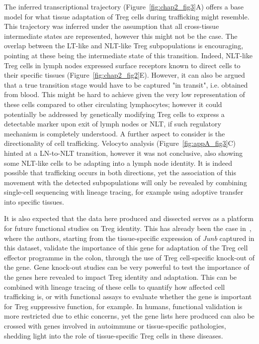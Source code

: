 The inferred transcriptional trajectory (Figure~\ref{fig:chap2_fig3}A) offers a base model for what tissue adaptation of Treg cells during trafficking might resemble. This trajectory was inferred under the assumption that all cross-tissue intermediate states are represented, however this might not be the case. The overlap between the LT-like and NLT-like Treg subpopulations is encouraging, pointing at these being the intermediate state of this transition. Indeed, NLT-like Treg cells in lymph nodes expressed surface receptors known to direct cells to their specific tissues (Figure~\ref{fig:chap2_fig2}E). However, it can also be argued that a true transition stage would have to be captured "in transit", i.e. obtained from blood. This might be hard to achieve given the very low representation of these cells compared to other circulating lymphocytes; however it could potentially be addressed by genetically modifying Treg cells to express a detectable marker upon exit of lymph nodes or NLT, if such regulatory mechanism is completely understood. A further aspect to consider is the directionality of cell trafficking. Velocyto analysis (Figure~\ref{fig:appA_fig3}C) hinted at a LN-to-NLT transition, however it was not conclusive, also showing some NLT-like cells to be adapting into a lymph node identity. It is indeed possible that trafficking occurs in both directions, yet the association of this movement with the detected subpopulations will only be revealed by combining single-cell sequencing with lineage tracing, for example using adoptive transfer into specific tissues.

It is also expected that the data here produced and dissected serves as a platform for future functional studies on Treg identity. This has already been the case in~\citep{wheaton_junb_2019}, where the authors, starting from the tissue-specific expression of \textit{Junb} captured in this dataset, validate the importance of this gene for adaptation of the Treg cell effector programme in the colon, through the use of Treg cell-specific knock-out of the gene. Gene knock-out studies can be very powerful to test the importance of the genes here revealed to impact Treg identity and adaptation. This can be combined with lineage tracing of these cells to quantify how affected cell trafficking is, or with functional assays to evaluate whether the gene is important for Treg suppressive function, for example. In humans, functional validation is more restricted due to ethic concerns, yet the gene lists here produced can also be crossed with genes involved in autoimmune or tissue-specific pathologies, shedding light into the role of tissue-specific Treg cells in these diseases.

